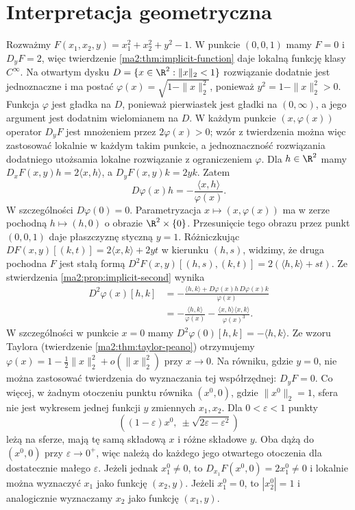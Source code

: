 \section{Interpretacja geometryczna}

\begin{przyklad}
\label{ma2:ex:implicit-sphere}
Rozważmy $F(x_1,x_2,y)=x_1^2+x_2^2+y^2-1$.
W punkcie $(0,0,1)$ mamy $F=0$ i $D_yF=2$, więc
twierdzenie \ref{ma2:thm:implicit-function} daje lokalną
funkcję klasy $C^\infty$. Na otwartym dysku
$D=\{x\in\R^2:\|x\|_2<1\}$ rozwiązanie dodatnie jest
jednoznaczne i ma postać
$\varphi(x)=\sqrt{1-\|x\|_2^2}$, ponieważ
$y^2=1-\|x\|_2^2>0$.
Funkcja $\varphi$ jest gładka na $D$, ponieważ
pierwiastek jest gładki na $(0,\infty)$, a jego
argument jest dodatnim wielomianem na $D$.
W każdym punkcie $(x,\varphi(x))$ operator $D_yF$
jest mnożeniem przez $2\varphi(x)>0$; wzór z twierdzenia
można więc zastosować lokalnie w każdym takim punkcie,
a jednoznaczność rozwiązania dodatniego utożsamia
lokalne rozwiązanie z ograniczeniem $\varphi$.
Dla $h\in\R^2$ mamy $D_xF(x,y)h=2\langle x,h\rangle$,
a $D_yF(x,y)k=2yk$. Zatem
\[
 D\varphi(x)h=-\frac{\langle x,h\rangle}{\varphi(x)}.
\]
W szczególności $D\varphi(0)=0$. Parametryzacja
$x\mapsto(x,\varphi(x))$ ma w zerze pochodną
$h\mapsto(h,0)$ o obrazie $\R^2\times\{0\}$.
Przesunięcie tego obrazu przez punkt $(0,0,1)$
daje płaszczyznę styczną $y=1$.
Różniczkując $DF(x,y)[(k,t)]=2\langle x,k\rangle+2yt$
w kierunku $(h,s)$, widzimy, że druga pochodna $F$
jest stałą formą
$D^2F(x,y)[(h,s),(k,t)]=2(\langle h,k\rangle+st)$.
Ze stwierdzenia \ref{ma2:prop:implicit-second} wynika
\[
 \begin{aligned}
 D^2\varphi(x)[h,k]
 &=-\frac{\langle h,k\rangle+
                   D\varphi(x)h\,D\varphi(x)k}{\varphi(x)}\\
 &=-\frac{\langle h,k\rangle}{\varphi(x)}
 -\frac{\langle x,h\rangle\langle x,k\rangle}{\varphi(x)^3}.
 \end{aligned}
\]
W szczególności w punkcie $x=0$ mamy $D^2\varphi(0)[h,k]=-\langle h,k\rangle$.
Ze wzoru Taylora (twierdzenie \ref{ma2:thm:taylor-peano})
otrzymujemy $\varphi(x)=1-\tfrac12\|x\|_2^2+o(\|x\|_2^2)$
przy $x\to0$.
Na równiku, gdzie $y=0$, nie można zastosować
twierdzenia do wyznaczania tej współrzędnej: $D_yF=0$.
Co więcej, w żadnym otoczeniu punktu równika
$(x^0,0)$, gdzie $\|x^0\|_2=1$, sfera nie jest
wykresem jednej funkcji $y$ zmiennych $x_1,x_2$.
Dla $0<\varepsilon<1$ punkty
\[
 ((1-\varepsilon)x^0,\ \pm\sqrt{2\varepsilon-\varepsilon^2})
\]
leżą na sferze, mają tę samą składową $x$ i różne
składowe $y$. Oba dążą do $(x^0,0)$ przy
$\varepsilon\to0^+$, więc należą do każdego jego
otwartego otoczenia dla dostatecznie małego
$\varepsilon$. Jeżeli jednak $x_1^0\ne0$, to
$D_{x_1}F(x^0,0)=2x_1^0\ne0$ i lokalnie można
wyznaczyć $x_1$ jako funkcję $(x_2,y)$.
Jeżeli $x_1^0=0$, to $|x_2^0|=1$ i analogicznie
wyznaczamy $x_2$ jako funkcję $(x_1,y)$.
\end{przyklad}

